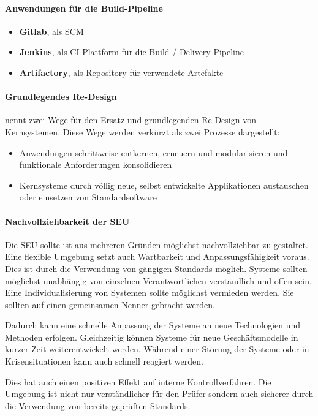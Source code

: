 \paragraph{Anwendungen für die Build-Pipeline}
\begin{itemize}
    \item \textbf{Gitlab}, als \ac{SCM}
    \item \textbf{Jenkins}, als \ac{CI} Plattform für die Build-/ Delivery-Pipeline
    \item \textbf{Artifactory}, als Repository für verwendete Artefakte
\end{itemize}

\paragraph{Grundlegendes Re-Design}
\label{ansatz:modularisieren}
\citet{Bussmann2006} nennt zwei Wege für den Ersatz und grundlegenden Re-Design von Kernsystemen. Diese Wege werden verkürzt als zwei Prozesse dargestellt:
\begin{itemize}
    \item Anwendungen schrittweise entkernen, erneuern und modularisieren und funktionale Anforderungen konsolidieren
    \item Kernsysteme durch völlig neue, selbst entwickelte Applikationen austauschen oder einsetzen von Standardsoftware
\end{itemize}

\paragraph{Nachvollziehbarkeit der SEU}
Die \ac{SEU} sollte ist aus mehreren Gründen möglichst nachvollziehbar zu gestaltet. Eine flexible Umgebung setzt auch Wartbarkeit und Anpassungsfähigkeit voraus. Dies ist durch die Verwendung von gängigen Standards möglich. Systeme sollten möglichst unabhängig von einzelnen Verantwortlichen verständlich und offen sein. Eine Individualisierung von Systemen sollte möglichst vermieden werden. Sie sollten auf einen gemeinsamen Nenner gebracht werden.

Dadurch kann eine schnelle Anpassung der Systeme an neue Technologien und Methoden erfolgen. Gleichzeitig können Systeme für neue Geschäftsmodelle in kurzer Zeit weiterentwickelt werden. Während einer Störung der Systeme oder in Krisensituationen kann auch schnell reagiert werden.

Dies hat auch einen positiven Effekt auf interne Kontrollverfahren. Die Umgebung ist nicht nur verständlicher für den Prüfer sondern auch sicherer durch die Verwendung von bereits geprüften Standards.

